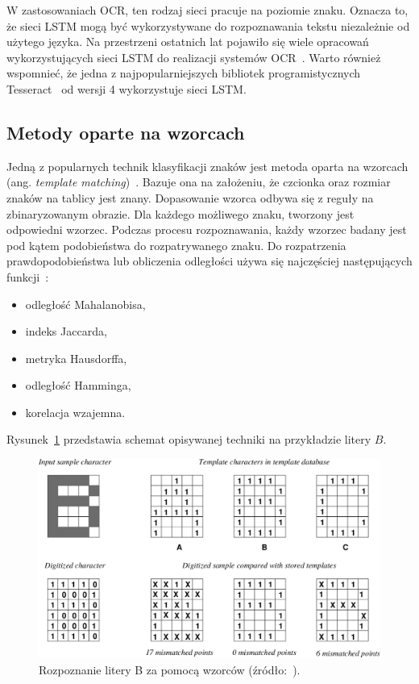 W zastosowaniach OCR, ten rodzaj sieci pracuje na poziomie znaku.
Oznacza to, że sieci LSTM mogą być wykorzystywane do rozpoznawania tekstu niezależnie od użytego języka.
Na przestrzeni ostatnich lat pojawiło się wiele opracowań wykorzystujących sieci LSTM do realizacji systemów OCR~\cite{10.1109, 8563237}.
Warto również wspomnieć, że jedna z najpopularniejszych bibliotek programistycznych Tesseract~\cite{tesseract} od wersji 4 wykorzystuje sieci LSTM\@.


\subsection{Metody oparte na wzorcach}
Jedną z popularnych technik klasyfikacji znaków jest metoda oparta na wzorcach (ang. \textit{template matching})~\cite{1219663, 1217917}.
Bazuje ona na założeniu, że czcionka oraz rozmiar znaków na tablicy jest znany.
Dopasowanie wzorca odbywa się z reguły na zbinaryzowanym obrazie.
Dla każdego możliwego znaku, tworzony jest odpowiedni wzorzec.
Podczas procesu rozpoznawania, każdy wzorzec badany jest pod kątem podobieństwa do rozpatrywanego znaku.
Do rozpatrzenia prawdopodobieństwa lub obliczenia odległości używa się najczęściej następujących funkcji~\cite{9310202}:
\begin{itemize}
    \item odległość Mahalanobisa,
    \item indeks Jaccarda,
    \item metryka Hausdorffa,
    \item odległość Hamminga,
    \item korelacja wzajemna.
\end{itemize}
Rysunek~\ref{fig:ocr_template_matching} przedstawia schemat opisywanej techniki na przykładzie litery $B$.
\begin{figure}[!ht]
    \centering
    \includegraphics[scale=0.3]{Pictures/ocr_template}
    \caption{Rozpoznanie litery B za pomocą wzorców (źródło:~\cite{Li1993AnIO}).}
    \label{fig:ocr_template_matching}
\end{figure}
